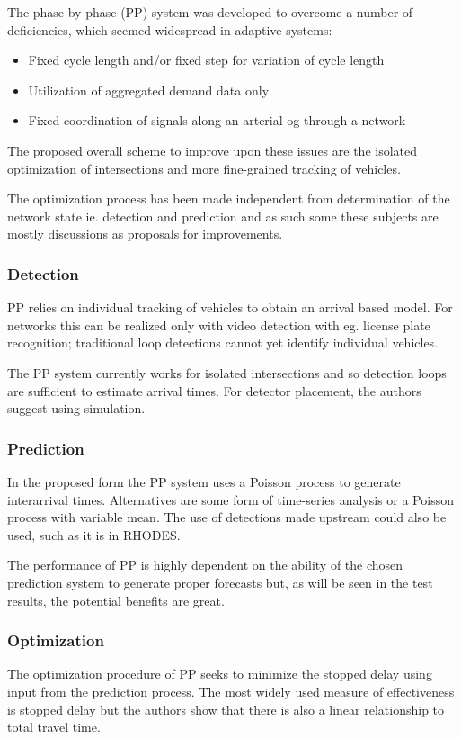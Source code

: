The phase-by-phase (PP) system was developed to overcome a number of deficiencies, which seemed widespread in adaptive systems:

\begin{itemize}
\item Fixed cycle length and/or fixed step for variation of cycle length
\item Utilization of aggregated demand data only
\item Fixed coordination of signals along an arterial og through a network
\end{itemize}

The proposed overall scheme to improve upon these issues are the isolated optimization of intersections and more fine-grained tracking of vehicles.

The optimization process has been made independent from determination of the network state ie. detection and prediction and as such some these subjects are mostly discussions as proposals for improvements.

\subsubsection*{Detection}
PP relies on individual tracking of vehicles to obtain an arrival based model. For networks this can be realized only with video detection with eg. license plate recognition; traditional loop detections cannot yet identify individual vehicles.

The PP system currently works for isolated intersections and so detection loops are sufficient to estimate arrival times. For detector placement, the authors suggest using simulation.

\subsubsection*{Prediction}
In the proposed form the PP system uses a Poisson process to generate interarrival times.
Alternatives are some form of time-series analysis or a Poisson process with variable mean. The use of detections made upstream could also be used, such as it is in RHODES.

The performance of PP is highly dependent on the ability of the chosen prediction system to generate proper forecasts but, as will be seen in the test results, the potential benefits are great.

\subsubsection*{Optimization}
The optimization procedure of PP seeks to minimize the stopped delay using input from the prediction process. The most widely used measure of effectiveness is stopped delay but the authors show that there is also a linear relationship to total travel time.

